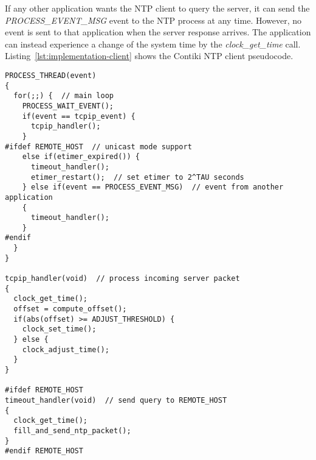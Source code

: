 If any other application wants the NTP client to query the server,
it can send the {\it{PROCESS\_EVENT\_MSG}} event to the NTP process at any time.
However, no event is sent to that application when the server response arrives.
The application can instead experience a change of
the system time by the {\it{clock\_get\_time}} call.
Listing~\ref{lst:implementation-client} shows the Contiki NTP client pseudocode.
\begin{lstlisting}[caption={NTP client pseudocode},label={lst:implementation-client}]
PROCESS_THREAD(event)
{
  for(;;) {  // main loop
    PROCESS_WAIT_EVENT();
    if(event == tcpip_event) {
      tcpip_handler();
    }
#ifdef REMOTE_HOST  // unicast mode support
    else if(etimer_expired()) {
      timeout_handler();
      etimer_restart();  // set etimer to 2^TAU seconds
    } else if(event == PROCESS_EVENT_MSG)  // event from another application
    {
      timeout_handler();
    }
#endif
  }
}

tcpip_handler(void)  // process incoming server packet
{
  clock_get_time();
  offset = compute_offset();
  if(abs(offset) >= ADJUST_THRESHOLD) {
    clock_set_time();
  } else {
    clock_adjust_time();
  }
}

#ifdef REMOTE_HOST
timeout_handler(void)  // send query to REMOTE_HOST
{
  clock_get_time();
  fill_and_send_ntp_packet();
}
#endif REMOTE_HOST
\end{lstlisting}

